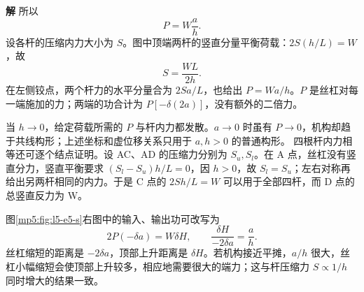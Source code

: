 \documentclass[11pt,openany,fontset=fandol]{ctexbook}
\theoremstyle{definition}\newtheorem{example}{例}[chapter]\newtheorem{exercise}{习题}[chapter]
\newcommand{\SolutionStart}{\par\medskip\ifdim\pagetotal>0pt\ifdim\dimexpr\pagegoal-\pagetotal\relax<3\baselineskip\newpage\fi\fi\noindent\textbf{解}\quad\ignorespaces}
\newenvironment{solution}{\SolutionStart}{\par\medskip}
\begin{document}
\begin{solution}
所以
\[
\boxed{P=W\frac ah.}
\]
设各杆的压缩内力大小为 $S$。图中顶端两杆的竖直分量平衡荷载：$2S(h/L)=W$，故
\[
\boxed{S=\frac{WL}{2h}.}
\]
在左侧铰点，两个杆力的水平分量合为 $2Sa/L$，也给出 $P=Wa/h$。$P$ 是丝杠对每一端施加的力；两端的功合计为 $P[-\delta(2a)]$，没有额外的二倍力。

当 $h\to0$，给定荷载所需的 $P$ 与杆内力都发散。$a\to0$ 时虽有 $P\to0$，机构却趋于共线构形；上述坐标和虚位移关系只用于 $a,h>0$ 的普通构形。
四根杆内力相等还可逐个结点证明。设 AC、AD 的压缩力分别为 $S_u,S_l$。在 A 点，丝杠没有竖直分力，竖直平衡要求 $(S_l-S_u)h/L=0$，因 $h>0$，故 $S_l=S_u$；左右对称再给出另两杆相同的内力。于是 C 点的 $2Sh/L=W$ 可以用于全部四杆，而 D 点的总竖直反力为 W。

图\ref{mp5:fig:l5-e5-s}右图中的输入、输出功可改写为
\[
2P(-\delta a)=W\delta H,
\qquad \frac{\delta H}{-2\delta a}=\frac ah.
\]
丝杠缩短的距离是 $-2\delta a$，顶部上升距离是 $\delta H$。若机构接近平摊，$a/h$ 很大，丝杠小幅缩短会使顶部上升较多，相应地需要很大的端力；这与杆压缩力 $S\propto1/h$ 同时增大的结果一致。

\end{solution}
\end{document}
